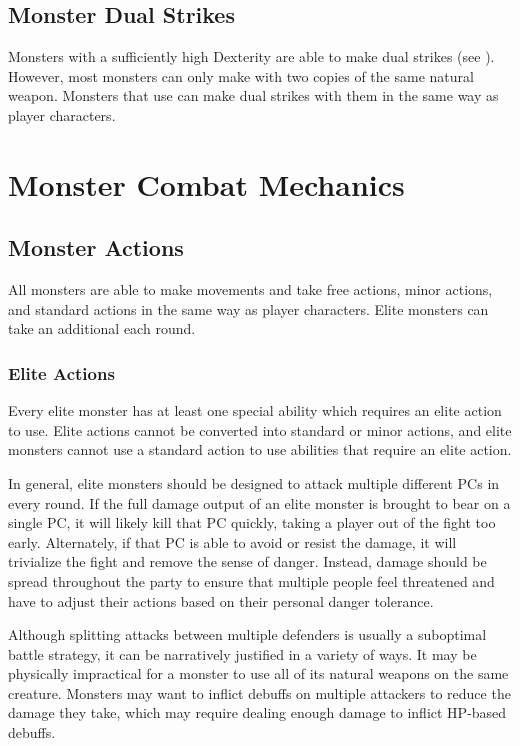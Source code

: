   \subsection{Monster Dual Strikes}\label{Monster Dual Strikes}
    Monsters with a sufficiently high Dexterity are able to make dual strikes (see ).
    However, most monsters can only make  with two copies of the same  natural weapon.
    Monsters that use  can make dual strikes with them in the same way as player characters.

\section{Monster Combat Mechanics}

  \subsection{Monster Actions}\label{Monster Actions}
    All monsters are able to make movements and take free actions, minor actions, and standard actions in the same way as player characters.
    Elite monsters can take an additional  each round.

    \subsubsection{Elite Actions}\label{Elite Actions}
      Every elite monster has at least one special ability which requires an elite action to use.
      Elite actions cannot be converted into standard or minor actions, and elite monsters cannot use a standard action to use abilities that require an elite action.

      In general, elite monsters should be designed to attack multiple different PCs in every round.
      If the full damage output of an elite monster is brought to bear on a single PC, it will likely kill that PC quickly, taking a player out of the fight too early.
      Alternately, if that PC is able to avoid or resist the damage, it will trivialize the fight and remove the sense of danger.
      Instead, damage should be spread throughout the party to ensure that multiple people feel threatened and have to adjust their actions based on their personal danger tolerance.

      Although splitting attacks between multiple defenders is usually a suboptimal battle strategy, it can be narratively justified in a variety of ways.
      It may be physically impractical for a monster to use all of its natural weapons on the same creature.
      Monsters may want to inflict debuffs on multiple attackers to reduce the damage they take, which may require dealing enough damage to inflict HP-based debuffs.

